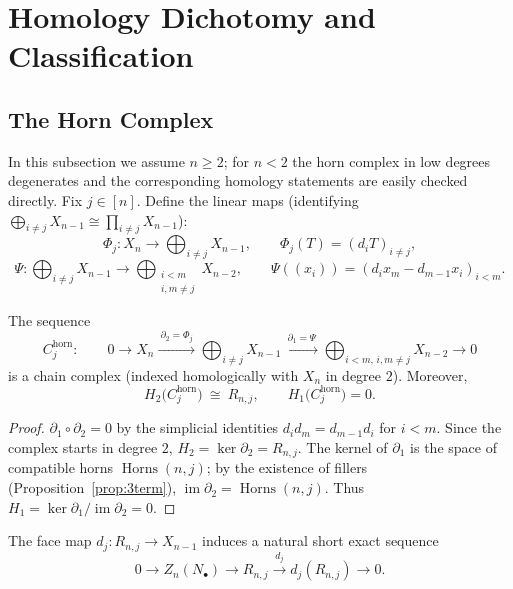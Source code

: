 \section{Homology Dichotomy and Classification}
\label{sec:dichotomy}


\subsection{The Horn Complex}

In this subsection we assume $n\ge 2$; for $n<2$ the horn complex in low degrees degenerates and the corresponding homology statements are easily checked directly.
Fix $j\in[n]$. Define the linear maps (identifying $\bigoplus_{i\ne j}X_{n-1}\cong \prod_{i\ne j}X_{n-1}$):
\[
\Phi_j:X_n\longrightarrow \bigoplus_{i\ne j}X_{n-1},\qquad
\Phi_j(T)=(d_iT)_{i\ne j},
\]
\[
\Psi:\bigoplus_{i\ne j}X_{n-1}\longrightarrow \bigoplus_{\substack{i<m\\ i,m\ne j}}X_{n-2},\qquad
\Psi((x_i))=(d_i x_m - d_{m-1} x_i)_{i<m}.
\]


\begin{proposition}\label{prop:horn-complex}
The sequence
\[
C^{\mathrm{horn}}_j:\qquad
0\longrightarrow X_n \xrightarrow{\ \partial_2=\Phi_j\ } \bigoplus_{i\ne j}X_{n-1}\xrightarrow{\ \partial_1=\Psi\ } \bigoplus_{i<m,\,i,m\ne j}X_{n-2}\longrightarrow 0
\]
is a chain complex (indexed homologically with $X_n$ in degree $2$). Moreover,
\[
H_2\bigl(C^{\mathrm{horn}}_j\bigr)\ \cong\ R_{n,j},
\qquad
H_1\bigl(C^{\mathrm{horn}}_j\bigr)=0.
\]
\end{proposition}

\begin{proof}
$\partial_1\circ\partial_2=0$ by the simplicial identities $d_i d_m=d_{m-1}d_i$ for $i<m$.
Since the complex starts in degree $2$, $H_2=\ker\partial_2=R_{n,j}$.
The kernel of $\partial_1$ is the space of compatible horns
$\operatorname{Horns}(n,j)$; by the existence of fillers (Proposition~\ref{prop:3term}),
$\operatorname{im}\partial_2=\operatorname{Horns}(n,j)$.
Thus $H_1 = \ker\partial_1 / \operatorname{im}\partial_2 = 0$.
\end{proof}

\begin{theorem}\label{thm:short-exact}
The face map $d_j:R_{n,j}\to X_{n-1}$ induces a natural short exact sequence
\[
0\longrightarrow Z_n(N_\bullet)\longrightarrow R_{n,j} \xrightarrow{\,d_j\,} d_j(R_{n,j})\longrightarrow 0.
\]
\end{theorem}


